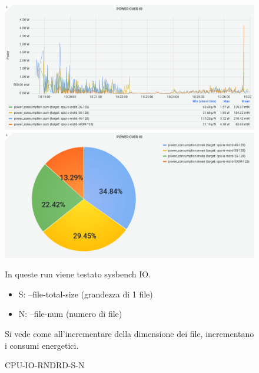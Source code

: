\documentclass[a4paper, 11pt]{article}
\begin{document}
\begin{figure}[h]
\caption{CPU-IO-RNDRD-S-N}
\centering
\includegraphics[scale=0.4]{image33}
\includegraphics[scale=0.4]{image36}
\begin{flushleft}
In queste run viene testato sysbench IO.
\begin{itemize}
\item S: --file-total-size (grandezza di 1 file)
\item N: --file-num (numero di file)
\end{itemize}
\end{flushleft}
\begin{flushleft}
Si vede come all'incrementare della dimensione dei file, incrementano i consumi energetici.
\end{flushleft}
\end{figure}
\end{document}
